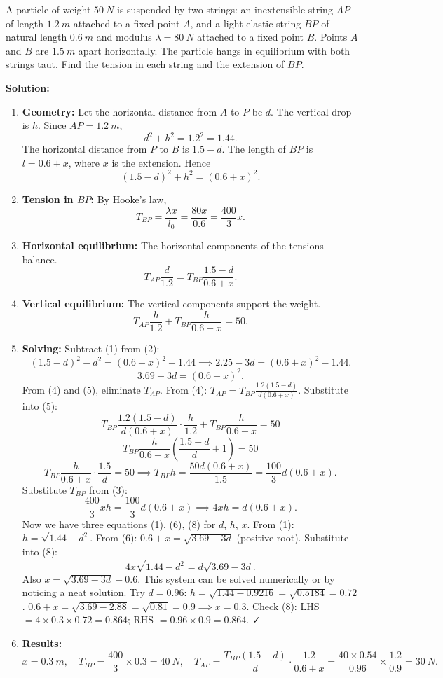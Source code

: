 \documentclass[11pt]{article}
\begin{document}
\begin{exoresolu}
A particle of weight \(\SI{50}{N}\) is suspended by two strings: an inextensible string \(AP\) of length \(\SI{1.2}{m}\) attached to a fixed point \(A\), and a light elastic string \(BP\) of natural length \(\SI{0.6}{m}\) and modulus \(\lambda = \SI{80}{N}\) attached to a fixed point \(B\). Points \(A\) and \(B\) are \(\SI{1.5}{m}\) apart horizontally. The particle hangs in equilibrium with both strings taut. Find the tension in each string and the extension of \(BP\).

\textbf{Solution:}
\begin{enumerate}
\item \textbf{Geometry:} Let the horizontal distance from \(A\) to \(P\) be \(d\). The vertical drop is \(h\). Since \(AP = \SI{1.2}{m}\),
\[
d^2 + h^2 = 1.2^2 = 1.44. \tag{1}
\]
The horizontal distance from \(P\) to \(B\) is \(1.5 - d\). The length of \(BP\) is \(l = 0.6 + x\), where \(x\) is the extension. Hence
\[
(1.5-d)^2 + h^2 = (0.6+x)^2. \tag{2}
\]
\item \textbf{Tension in \(BP\):} By Hooke's law,
\[
T_{BP} = \frac{\lambda x}{l_0} = \frac{80x}{0.6} = \frac{400}{3}x. \tag{3}
\]
\item \textbf{Horizontal equilibrium:} The horizontal components of the tensions balance.
\[
T_{AP} \frac{d}{1.2} = T_{BP} \frac{1.5-d}{0.6+x}. \tag{4}
\]
\item \textbf{Vertical equilibrium:} The vertical components support the weight.
\[
T_{AP} \frac{h}{1.2} + T_{BP} \frac{h}{0.6+x} = 50. \tag{5}
\]
\item \textbf{Solving:} Subtract (1) from (2):
\[
(1.5-d)^2 - d^2 = (0.6+x)^2 - 1.44 \implies 2.25 - 3d = (0.6+x)^2 - 1.44.
\]
\[
3.69 - 3d = (0.6+x)^2. \tag{6}
\]
From (4) and (5), eliminate \(T_{AP}\). From (4): \(T_{AP} = T_{BP} \frac{1.2(1.5-d)}{d(0.6+x)}\). Substitute into (5):
\[
T_{BP} \frac{1.2(1.5-d)}{d(0.6+x)} \cdot \frac{h}{1.2} + T_{BP} \frac{h}{0.6+x} = 50
\]
\[
T_{BP} \frac{h}{0.6+x} \left( \frac{1.5-d}{d} + 1 \right) = 50
\]
\[
T_{BP} \frac{h}{0.6+x} \cdot \frac{1.5}{d} = 50 \implies T_{BP} h = \frac{50 d (0.6+x)}{1.5} = \frac{100}{3} d (0.6+x). \tag{7}
\]
Substitute \(T_{BP}\) from (3):
\[
\frac{400}{3} x h = \frac{100}{3} d (0.6+x) \implies 4 x h = d (0.6+x). \tag{8}
\]
Now we have three equations (1), (6), (8) for \(d\), \(h\), \(x\). From (1): \(h = \sqrt{1.44 - d^2}\). From (6): \(0.6+x = \sqrt{3.69 - 3d}\) (positive root). Substitute into (8):
\[
4 x \sqrt{1.44 - d^2} = d \sqrt{3.69 - 3d}.
\]
Also \(x = \sqrt{3.69 - 3d} - 0.6\). This system can be solved numerically or by noticing a neat solution. Try \(d = 0.96\):
\(h = \sqrt{1.44 - 0.9216} = \sqrt{0.5184} = 0.72\).
\(0.6+x = \sqrt{3.69 - 2.88} = \sqrt{0.81} = 0.9 \implies x = 0.3\).
Check (8): LHS \(= 4 \times 0.3 \times 0.72 = 0.864\); RHS \(= 0.96 \times 0.9 = 0.864\). ✓
\item \textbf{Results:}
\[
x = \SI{0.3}{m},\quad T_{BP} = \frac{400}{3} \times 0.3 = \SI{40}{N},\quad T_{AP} = \frac{T_{BP}(1.5-d)}{d} \cdot \frac{1.2}{0.6+x} = \frac{40 \times 0.54}{0.96} \times \frac{1.2}{0.9} = \SI{30}{N}.
\]
\end{enumerate}
\end{exoresolu}
\end{document}
